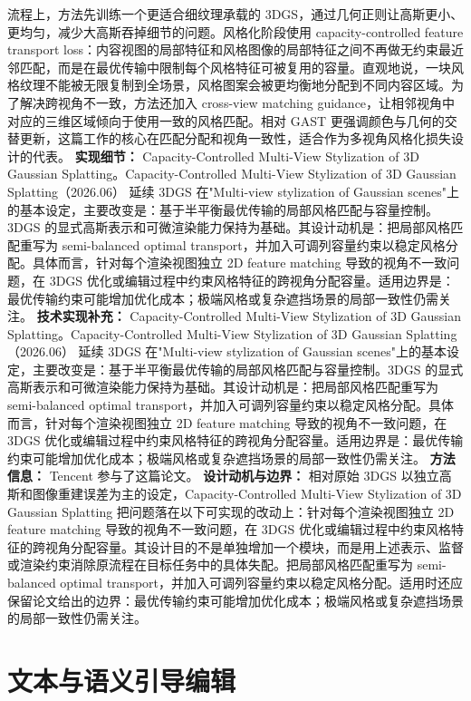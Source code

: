 流程上，方法先训练一个更适合细纹理承载的 3DGS，通过几何正则让高斯更小、更均匀，减少大高斯吞掉细节的问题。风格化阶段使用 capacity-controlled feature transport loss：内容视图的局部特征和风格图像的局部特征之间不再做无约束最近邻匹配，而是在最优传输中限制每个风格特征可被复用的容量。直观地说，一块风格纹理不能被无限复制到全场景，风格图案会被更均衡地分配到不同内容区域。为了解决跨视角不一致，方法还加入 cross-view matching guidance，让相邻视角中对应的三维区域倾向于使用一致的风格匹配。相对 GAST 更强调颜色与几何的交替更新，这篇工作的核心在匹配分配和视角一致性，适合作为多视角风格化损失设计的代表。
\textbf{实现细节：} Capacity-Controlled Multi-View Stylization of 3D Gaussian Splatting。Capacity-Controlled Multi-View Stylization of 3D Gaussian Splatting（2026.06） 延续 3DGS 在"Multi-view stylization of Gaussian scenes"上的基本设定，主要改变是：基于半平衡最优传输的局部风格匹配与容量控制。3DGS 的显式高斯表示和可微渲染能力保持为基础。其设计动机是：把局部风格匹配重写为 semi-balanced optimal transport，并加入可调列容量约束以稳定风格分配。具体而言，针对每个渲染视图独立 2D feature matching 导致的视角不一致问题，在 3DGS 优化或编辑过程中约束风格特征的跨视角分配容量。适用边界是：最优传输约束可能增加优化成本；极端风格或复杂遮挡场景的局部一致性仍需关注。
\textbf{技术实现补充：} Capacity-Controlled Multi-View Stylization of 3D Gaussian Splatting。Capacity-Controlled Multi-View Stylization of 3D Gaussian Splatting（2026.06） 延续 3DGS 在"Multi-view stylization of Gaussian scenes"上的基本设定，主要改变是：基于半平衡最优传输的局部风格匹配与容量控制。3DGS 的显式高斯表示和可微渲染能力保持为基础。其设计动机是：把局部风格匹配重写为 semi-balanced optimal transport，并加入可调列容量约束以稳定风格分配。具体而言，针对每个渲染视图独立 2D feature matching 导致的视角不一致问题，在 3DGS 优化或编辑过程中约束风格特征的跨视角分配容量。适用边界是：最优传输约束可能增加优化成本；极端风格或复杂遮挡场景的局部一致性仍需关注。
\textbf{方法信息：} Tencent 参与了这篇论文。
\textbf{设计动机与边界：} 相对原始 3DGS 以独立高斯和图像重建误差为主的设定，Capacity-Controlled Multi-View Stylization of 3D Gaussian Splatting 把问题落在以下可实现的改动上：针对每个渲染视图独立 2D feature matching 导致的视角不一致问题，在 3DGS 优化或编辑过程中约束风格特征的跨视角分配容量。其设计目的不是单独增加一个模块，而是用上述表示、监督或渲染约束消除原流程在目标任务中的具体失配。把局部风格匹配重写为 semi-balanced optimal transport，并加入可调列容量约束以稳定风格分配。适用时还应保留论文给出的边界：最优传输约束可能增加优化成本；极端风格或复杂遮挡场景的局部一致性仍需关注。

\section{文本与语义引导编辑}

